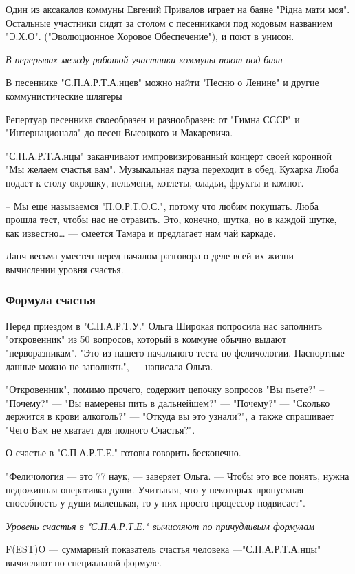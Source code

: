 Один из аксакалов коммуны Евгений Привалов играет на баяне "Рідна мати моя".
Остальные участники сидят за столом с песенниками под кодовым названием
"Э.Х.О". ("Эволюционное Хоровое Обеспечение"), и поют в унисон.

{\em
В перерывах между работой участники коммуны поют под баян
\/}

В песеннике "С.П.А.Р.Т.А.нцев" можно найти "Песню о Ленине" и другие
коммунистические шлягеры

Репертуар песенника своеобразен и разнообразен: от "Гимна СССР" и
"Интернационала" до песен Высоцкого и Макаревича.

"С.П.А.Р.Т.А.нцы" заканчивают импровизированный концерт своей коронной "Мы
желаем счастья вам". Музыкальная пауза переходит в обед. Кухарка Люба подает к
столу окрошку, пельмени, котлеты, оладьи, фрукты и компот.

– Мы еще называемся "П.О.Р.Т.О.С.", потому что любим покушать. Люба прошла
тест, чтобы нас не отравить. Это, конечно, шутка, но в каждой шутке, как
известно… --- смеется Тамара и предлагает нам чай каркаде.

Ланч весьма уместен перед началом разговора о деле всей их жизни --- вычислении
уровня счастья.

\subsubsection{Формула счастья}

Перед приездом в "С.П.А.Р.Т.У." Ольга Широкая попросила нас заполнить
"откровенник" из 50 вопросов, который в коммуне обычно выдают "перворазникам".
"Это из нашего начального теста по феличологии. Паспортные данные можно не
заполнять", --- написала Ольга.

"Откровенник", помимо прочего, содержит цепочку вопросов "Вы пьете?" –
"Почему?" --- "Вы намерены пить в дальнейшем?" --- "Почему?" --- "Сколько держится в
крови алкоголь?" --- "Откуда вы это узнали?", а также спрашивает "Чего Вам не
хватает для полного Счастья?". 

О счастье в "С.П.А.Р.Т.Е." готовы говорить бесконечно.

"Феличология --- это 77 наук, --- заверяет Ольга. --- Чтобы это все понять, нужна
недюжинная оперативка души. Учитывая, что у некоторых пропускная способность у
души маленькая, то у них просто процессор подвисает".

{\em
Уровень счастья в "С.П.А.Р.Т.Е." вычисляют по причудливым формулам
\/}

F(EST)O --- суммарный показатель счастья человека —"С.П.А.Р.Т.А.нцы" вычисляют по
специальной формуле.

